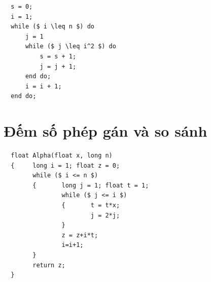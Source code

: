 \documentclass[12pt, letterpaper]{article}
\begin{document}
\begin{lstlisting}
  s = 0;
  i = 1;
  while ($ i \leq n $) do
      j = 1
      while ($ j \leq i^2 $) do
          s = s + 1;
          j = j + 1;
      end do;
      i = i + 1;
  end do;
  \end{lstlisting}

\section{Đếm số phép gán và so sánh}

\begin{lstlisting}
  float Alpha(float x, long n)
  {     long i = 1; float z = 0;
        while ($ i <= n $)
        {       long j = 1; float t = 1;
                while ($ j <= i $)
                {       t = t*x;
                        j = 2*j;
                }
                z = z+i*t;
                i=i+1;
        }
        return z;
  }
  \end{lstlisting}
\end{document}
